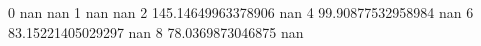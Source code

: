 0 nan nan
1 nan nan
2 145.14649963378906 nan
4 99.90877532958984 nan
6 83.15221405029297 nan
8 78.0369873046875 nan
